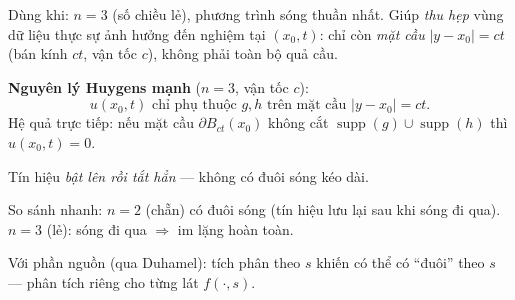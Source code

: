 \begin{dieukienbox}
Dùng khi: $n=3$ (số chiều lẻ), phương trình sóng thuần nhất.
Giúp \emph{thu hẹp} vùng dữ liệu thực sự ảnh hưởng đến nghiệm tại $(x_0,t)$:
chỉ còn \emph{mặt cầu} $|y-x_0|=ct$ (bán kính $ct$, vận tốc $c$), không phải toàn bộ quả cầu.
\end{dieukienbox}

\begin{nhobox}
\textbf{Nguyên lý Huygens mạnh} ($n=3$, vận tốc $c$):
\[
  u(x_0,t) \text{ chỉ phụ thuộc } g,h \text{ trên mặt cầu } |y-x_0|=ct.
\]
Hệ quả trực tiếp: nếu mặt cầu $\partial B_{ct}(x_0)$ không cắt $\operatorname{supp}(g)\cup\operatorname{supp}(h)$
thì $u(x_0,t)=0$.

Tín hiệu \emph{bật lên rồi tắt hẳn} --- không có đuôi sóng kéo dài.
\end{nhobox}

\begin{meobox}
So sánh nhanh: $n=2$ (chẵn) có đuôi sóng (tín hiệu lưu lại sau khi sóng đi qua).
$n=3$ (lẻ): sóng đi qua $\Rightarrow$ im lặng hoàn toàn.

\medskip
Với phần nguồn (qua Duhamel): tích phân theo $s$ khiến có thể có ``đuôi'' theo $s$ ---
phân tích riêng cho từng lát $f(\cdot,s)$.
\end{meobox}
